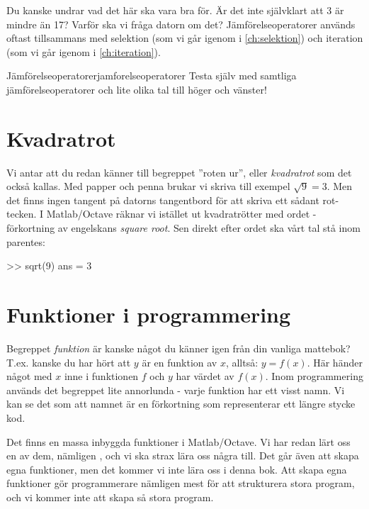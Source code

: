 Du kanske undrar vad det här ska vara bra för. Är det inte självklart att 3 är mindre än 17? Varför ska vi fråga datorn om det? Jämförelseoperatorer används oftast tillsammans med selektion (som vi går igenom i \autoref{ch:selektion}) och iteration (som vi går igenom i \autoref{ch:iteration}).


\begin{matteovning}{Jämförelseoperatorer}{jamforelseoperatorer}
Testa själv med samtliga jämförelseoperatorer och lite olika tal till höger och vänster!
\end{matteovning}



\section{Kvadratrot}

Vi antar att du redan känner till begreppet ''roten ur'', eller \emph{kvadratrot} som det också kallas. Med papper och penna brukar vi skriva till exempel $\sqrt9 = 3$. Men det finns ingen tangent på datorns tangentbord för att skriva ett sådant rot-tecken. I Matlab/Octave räknar vi istället ut kvadratrötter med ordet  - förkortning av engelskans \emph{square root}. Sen direkt efter ordet  ska vårt tal stå inom parentes:

\begin{matlab}[caption={Kvadratrot, roten ur 9},label={}]
>> sqrt(9)
ans = 3
\end{matlab}


\section{Funktioner i programmering}

Begreppet \emph{funktion} är kanske något du känner igen från din vanliga mattebok? T.ex. kanske du har hört att $y$ är en funktion av $x$, alltså: $y=f(x)$. Här händer något med $x$ inne i funktionen $f$ och $y$ har värdet av $f(x)$. Inom programmering används det begreppet lite annorlunda - varje funktion har ett visst namn. Vi kan se det som att namnet är en förkortning som representerar ett längre stycke kod.

Det finns en massa inbyggda funktioner i Matlab/Octave. Vi har redan lärt oss en av dem, nämligen , och vi ska strax lära oss några till. Det går även att skapa egna funktioner, men det kommer vi inte lära oss i denna bok. Att skapa egna funktioner gör programmerare nämligen mest för att strukturera stora program, och vi kommer inte att skapa så stora program.

